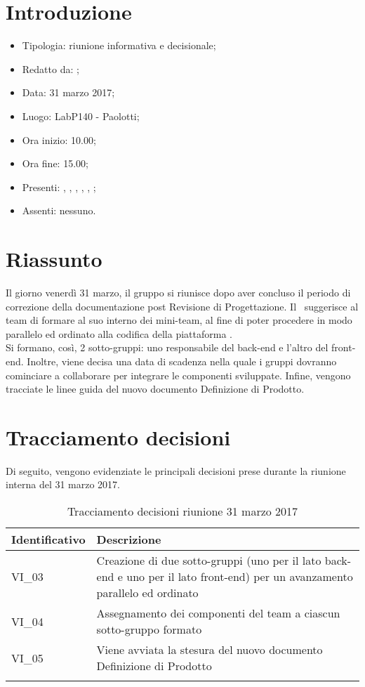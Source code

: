 \section{Introduzione}

	\begin{itemize}
		\item Tipologia: riunione informativa e decisionale;
		\item Redatto da: \NS;
		\item Data: 31 marzo 2017;
		\item Luogo: LabP140 - Paolotti;
		\item Ora inizio: 10.00;
		\item Ora fine: 15.00;
		\item Presenti: \AS, \DS, \MC, \AN, \NS, \DAN;	
		\item Assenti: nessuno.
	\end{itemize}

\section{Riassunto}
Il giorno venerdì 31 marzo, il gruppo si riunisce dopo aver concluso il periodo di correzione della documentazione post Revisione di Progettazione. Il \RdP\ suggerisce al team di formare al suo interno dei mini-team, al fine di poter procedere in modo parallelo ed ordinato alla codifica della piattaforma \progetto.\\
Si formano, così, 2 sotto-gruppi: uno responsabile del back-end e l'altro del front-end. Inoltre, viene decisa una data di scadenza nella quale i gruppi dovranno cominciare a collaborare per integrare le componenti sviluppate.
Infine, vengono tracciate le linee guida del nuovo documento Definizione di Prodotto.

\section{Tracciamento decisioni}
Di seguito, vengono evidenziate le principali decisioni prese durante la riunione interna del 31 marzo 2017.

\begin{longtable}{|>{\centering\arraybackslash}p{4cm}|>{\centering\arraybackslash}p{9cm}|}
	\hline \rowcolor{Gray}
	\textbf{Identificativo} & \textbf{Descrizione}\\
	\hline
	\endhead
			VI\_03	& Creazione di due sotto-gruppi (uno per il lato back-end e uno per il lato front-end) per un avanzamento parallelo ed ordinato	\\
			\hline
			VI\_04 & Assegnamento dei componenti del team a ciascun sotto-gruppo formato \\
			\hline
			VI\_05 & Viene avviata la stesura del nuovo documento Definizione di Prodotto \\
			\hline
		\caption{Tracciamento decisioni riunione 31 marzo 2017}
	\end{longtable}